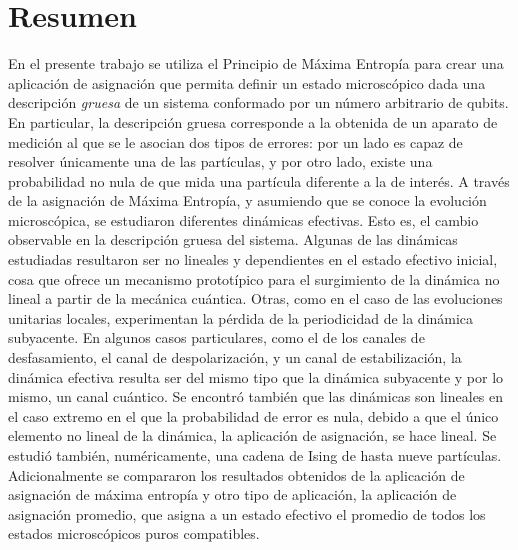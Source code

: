 \section*{Resumen}

En el presente trabajo se utiliza el Principio de Máxima Entropía para crear una aplicación de asignación que permita definir un estado microscópico dada una descripción \textit{gruesa} de un sistema conformado por un número arbitrario de qubits. En particular, la descripción gruesa corresponde a la obtenida de un aparato de medición al que se le asocian dos tipos de errores: por un lado es capaz de resolver únicamente una de las partículas, y por otro lado, existe una probabilidad no nula de que mida una partícula diferente a la de interés. A través de la asignación de Máxima Entropía, y asumiendo que se conoce la evolución microscópica, se estudiaron diferentes dinámicas efectivas. Esto es, el cambio observable en la descripción gruesa del sistema. Algunas de las dinámicas estudiadas resultaron ser no lineales y dependientes en el estado efectivo inicial, cosa que ofrece un mecanismo prototípico para el surgimiento de la dinámica no lineal a partir de la mecánica cuántica. Otras, como en el caso de las evoluciones unitarias locales, experimentan la pérdida de la periodicidad de la dinámica subyacente. En algunos casos particulares, como el de los canales de desfasamiento, el canal de despolarización, y un canal de estabilización, la dinámica efectiva resulta ser del mismo tipo que la dinámica subyacente y por lo mismo, un canal cuántico. Se encontró también que las dinámicas son lineales en el caso extremo en el que la probabilidad de error es nula, debido a que el único elemento no lineal de la dinámica, la aplicación de asignación, se hace lineal. Se estudió también, numéricamente, una cadena de Ising de hasta nueve partículas. Adicionalmente se compararon los resultados obtenidos de la aplicación de asignación de máxima entropía y otro tipo de aplicación, la aplicación de asignación promedio, que asigna a un estado efectivo el promedio de todos los estados microscópicos puros compatibles.
